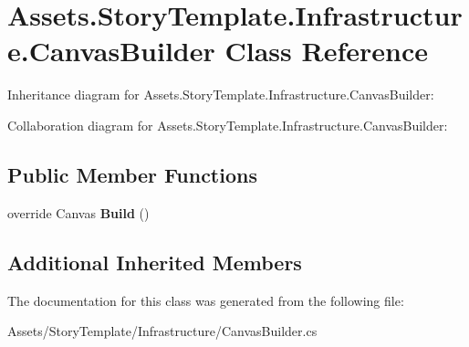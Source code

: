 \hypertarget{classAssets_1_1StoryTemplate_1_1Infrastructure_1_1CanvasBuilder}{}\section{Assets.\+Story\+Template.\+Infrastructure.\+Canvas\+Builder Class Reference}
\label{classAssets_1_1StoryTemplate_1_1Infrastructure_1_1CanvasBuilder}


Inheritance diagram for Assets.\+Story\+Template.\+Infrastructure.\+Canvas\+Builder\+:


Collaboration diagram for Assets.\+Story\+Template.\+Infrastructure.\+Canvas\+Builder\+:
\subsection*{Public Member Functions}
\begin{DoxyCompactItemize}
\item 
override Canvas {\bfseries Build} ()\hypertarget{classAssets_1_1StoryTemplate_1_1Infrastructure_1_1CanvasBuilder_aee24d5e0d2b0c9d2bbb28926dae642d4}{}\label{classAssets_1_1StoryTemplate_1_1Infrastructure_1_1CanvasBuilder_aee24d5e0d2b0c9d2bbb28926dae642d4}

\end{DoxyCompactItemize}
\subsection*{Additional Inherited Members}


The documentation for this class was generated from the following file\+:\begin{DoxyCompactItemize}
\item 
Assets/\+Story\+Template/\+Infrastructure/Canvas\+Builder.\+cs\end{DoxyCompactItemize}

